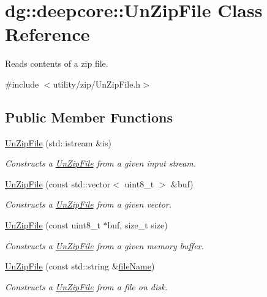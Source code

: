 \hypertarget{classdg_1_1deepcore_1_1_un_zip_file}{}\section{dg\+:\+:deepcore\+:\+:Un\+Zip\+File Class Reference}
\label{classdg_1_1deepcore_1_1_un_zip_file}


Reads contents of a zip file.  




{\ttfamily \#include $<$utility/zip/\+Un\+Zip\+File.\+h$>$}

\subsection*{Public Member Functions}
\begin{DoxyCompactItemize}
\item 
\hyperlink{group___utility_module_gac32fa3973017fa76647d90ab64bbceae}{Un\+Zip\+File} (std\+::istream \&is)
\begin{DoxyCompactList}\small\item\em Constructs a \hyperlink{classdg_1_1deepcore_1_1_un_zip_file}{Un\+Zip\+File} from a given input stream. \end{DoxyCompactList}\item 
\hyperlink{group___utility_module_ga64e2c80586cc8429067c15ab1fa39e08}{Un\+Zip\+File} (const std\+::vector$<$ uint8\+\_\+t $>$ \&buf)
\begin{DoxyCompactList}\small\item\em Constructs a \hyperlink{classdg_1_1deepcore_1_1_un_zip_file}{Un\+Zip\+File} from a given vector. \end{DoxyCompactList}\item 
\hyperlink{group___utility_module_ga1efd284e3fbbef3d57a598c47a7cc73b}{Un\+Zip\+File} (const uint8\+\_\+t $\ast$buf, size\+\_\+t size)
\begin{DoxyCompactList}\small\item\em Constructs a \hyperlink{classdg_1_1deepcore_1_1_un_zip_file}{Un\+Zip\+File} from a given memory buffer. \end{DoxyCompactList}\item 
\hyperlink{group___utility_module_ga4418028e98c6031359ace40625987864}{Un\+Zip\+File} (const std\+::string \&\hyperlink{group___utility_module_ga4c5433ff98fc88ebe244871a16660e0f}{file\+Name})
\begin{DoxyCompactList}\small\item\em Constructs a \hyperlink{classdg_1_1deepcore_1_1_un_zip_file}{Un\+Zip\+File} from a file on disk. \end{DoxyCompactList}\item 

\end{DoxyCompactItemize}
